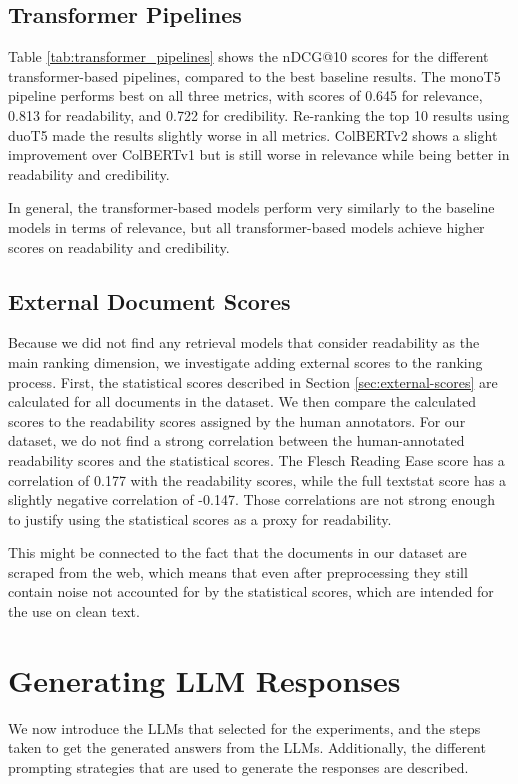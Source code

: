\subsection{Transformer Pipelines}
Table \ref{tab:transformer_pipelines} shows the nDCG@10 scores for the different transformer-based pipelines, compared to the best baseline results.
The monoT5 pipeline performs best on all three metrics, with scores of 0.645 for relevance, 0.813 for readability, and 0.722 for credibility.
Re-ranking the top 10 results using duoT5 made the results slightly worse in all metrics.
ColBERTv2 shows a slight improvement over ColBERTv1 but is still worse in relevance while being better in readability and credibility.

In general, the transformer-based models perform very similarly to the baseline models in terms of relevance, but all transformer-based models achieve higher scores on readability and credibility.

\subsection{External Document Scores}
Because we did not find any retrieval models that consider readability as the main ranking dimension, we investigate adding external scores to the ranking process.
First, the statistical scores described in Section \ref{sec:external-scores} are calculated for all documents in the dataset.
We then compare the calculated scores to the readability scores assigned by the human annotators.
For our dataset, we do not find a strong correlation between the human-annotated readability scores and the statistical scores.
The Flesch Reading Ease score has a correlation of 0.177 with the readability scores, while the full textstat score has a slightly negative correlation of -0.147.
Those correlations are not strong enough to justify using the statistical scores as a proxy for readability.

This might be connected to the fact that the documents in our dataset are scraped from the web, which means that even after preprocessing they still contain noise not accounted for by the statistical scores, which are intended for the use on clean text.

\section{Generating LLM Responses}
We now introduce the LLMs that selected for the experiments, and the steps taken to get the generated answers from the LLMs.
Additionally, the different prompting strategies that are used to generate the responses are described.

